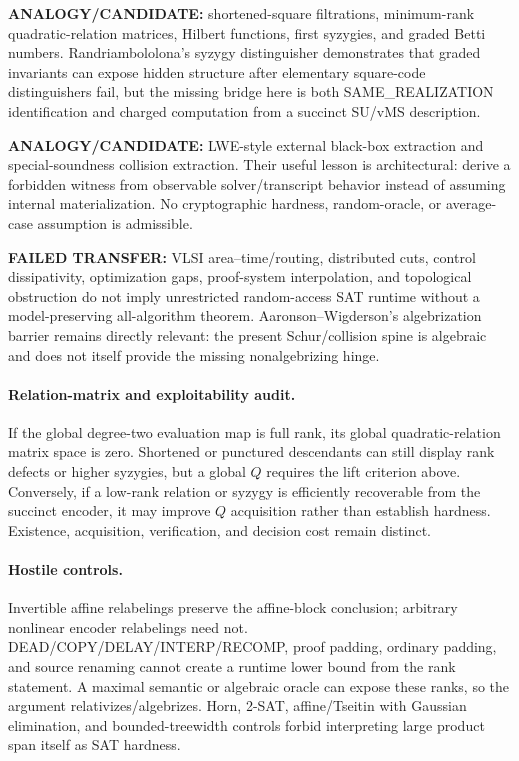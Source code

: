 \documentclass[11pt]{article}
\begin{document}
\textbf{ANALOGY/CANDIDATE:} shortened-square filtrations, minimum-rank quadratic-relation matrices, Hilbert functions, first syzygies, and graded Betti numbers. Randriambololona's syzygy distinguisher demonstrates that graded invariants can expose hidden structure after elementary square-code distinguishers fail, but the missing bridge here is both SAME\_REALIZATION identification and charged computation from a succinct SU/vMS description.

\textbf{ANALOGY/CANDIDATE:} LWE-style external black-box extraction and special-soundness collision extraction. Their useful lesson is architectural: derive a forbidden witness from observable solver/transcript behavior instead of assuming internal materialization. No cryptographic hardness, random-oracle, or average-case assumption is admissible.

\textbf{FAILED TRANSFER:} VLSI area--time/routing, distributed cuts, control dissipativity, optimization gaps, proof-system interpolation, and topological obstruction do not imply unrestricted random-access SAT runtime without a model-preserving all-algorithm theorem. Aaronson--Wigderson's algebrization barrier remains directly relevant: the present Schur/collision spine is algebraic and does not itself provide the missing nonalgebrizing hinge.

\paragraph{Relation-matrix and exploitability audit.}
If the global degree-two evaluation map is full rank, its global quadratic-relation matrix space is zero. Shortened or punctured descendants can still display rank defects or higher syzygies, but a global $Q$ requires the lift criterion above. Conversely, if a low-rank relation or syzygy is efficiently recoverable from the succinct encoder, it may improve $Q$ acquisition rather than establish hardness. Existence, acquisition, verification, and decision cost remain distinct.

\paragraph{Hostile controls.}
Invertible affine relabelings preserve the affine-block conclusion; arbitrary nonlinear encoder relabelings need not. DEAD/COPY/DELAY/INTERP/RECOMP, proof padding, ordinary padding, and source renaming cannot create a runtime lower bound from the rank statement. A maximal semantic or algebraic oracle can expose these ranks, so the argument relativizes/algebrizes. Horn, 2-SAT, affine/Tseitin with Gaussian elimination, and bounded-treewidth controls forbid interpreting large product span itself as SAT hardness.
\end{document}
